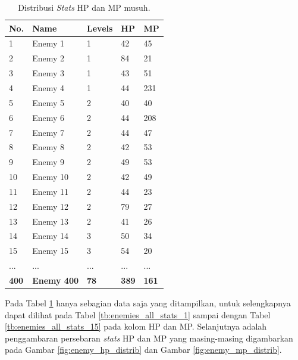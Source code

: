 \begin{longtable}{|l|l|l|l|l|}
	\caption{Distribusi \textit{Stats} HP dan MP musuh.}
	\label{tb:enemy_weak_stats}\\
	\hline
	\rowcolor[HTML]{C0C0C0} 
	\textbf{No.} & \textbf{Name} & \textbf{Levels} & \textbf{HP} & \textbf{MP} \\ \hline
	1 & Enemy 1 & 1 & 42 & 45 \\ \hline
	2 & Enemy 2 & 1 & 84 & 21 \\ \hline
	3 & Enemy 3 & 1 & 43 & 51 \\ \hline
	4 & Enemy 4 & 1 & 44 & 231 \\ \hline
	5 & Enemy 5 & 2 & 40 & 40 \\ \hline
	6 & Enemy 6 & 2 & 44 & 208 \\ \hline
	7 & Enemy 7 & 2 & 44 & 47 \\ \hline
	8 & Enemy 8 & 2 & 42 & 53 \\ \hline
	9 & Enemy 9 & 2 & 49 & 53 \\ \hline
	10 & Enemy 10 & 2 & 42 & 49 \\ \hline
	11 & Enemy 11 & 2 & 44 & 23 \\ \hline
	12 & Enemy 12 & 2 & 79 & 27 \\ \hline
	13 & Enemy 13 & 2 & 41 & 26 \\ \hline
	14 & Enemy 14 & 3 & 50 & 34 \\ \hline
	15 & Enemy 15 & 3 & 54 & 20 \\ \hline
	... & ... & ... & ... & ... \\ \hline
	\textbf{400} & \textbf{Enemy 400} & \textbf{78} & \textbf{389} & \textbf{161} \\ \hline
\end{longtable}
\vspace{1ex}

Pada Tabel \ref{tb:enemy_weak_stats} hanya sebagian data saja yang ditampilkan, untuk selengkapnya dapat dilihat pada Tabel \ref{tb:enemies_all_stats_1} sampai dengan Tabel \ref{tb:enemies_all_stats_15} pada kolom HP dan MP. Selanjutnya adalah penggambaran persebaran \textit{stats} HP dan MP yang masing-masing digambarkan pada Gambar \ref{fig:enemy_hp_distrib} dan Gambar \ref{fig:enemy_mp_distrib}.
\vspace{1ex}

